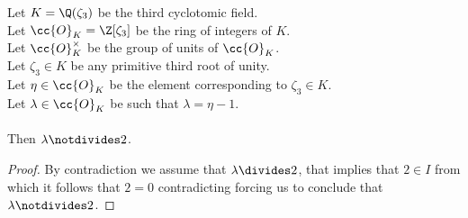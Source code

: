 \begin{lemma}
    \label{lmm:lambda_not_dvd_two}
    \leanok
    Let $K = \Q(\zeta_3)$ be the third cyclotomic field. \\
    Let $\cc{O}_K = \Z[\zeta_3]$ be the ring of integers of $K$. \\
    Let $\cc{O}^\times_K$ be the group of units of $\cc{O}_K$. \\
    Let $\zeta_3 \in K$ be any primitive third root of unity. \\
    Let $\eta \in \cc{O}_K$ be the element corresponding to $\zeta_3 \in K$. \\
    Let $\lambda \in \cc{O}_K$ be such that $\lambda = \eta -1$. \\\\
    Then $\lambda \notdivides 2$.
\end{lemma}
\begin{proof}
    \leanok
    By contradiction we assume that $\lambda \divides 2$, that implies that $2 \in I$
    from which it follows that $2 = 0$ contradicting 
    forcing us to conclude that $\lambda \notdivides 2$.
\end{proof}

